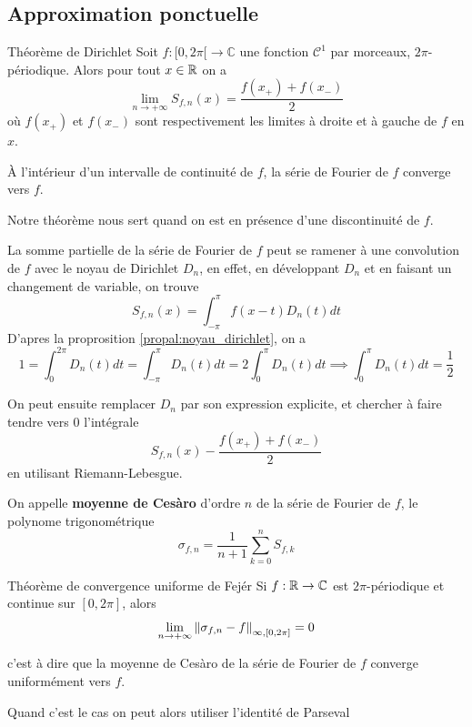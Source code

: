 \documentclass[a4paper, 12pt]{article}
\renewcommand*{\today}{02 April 2026}
\begin{document}
\hotbox{Analyse 4}{CM 14}{\today}

\subsection{Approximation ponctuelle}

\begin{theoreme}{Théorème de Dirichlet}{}
    Soit $f: [0, 2\pi[ \to \mathbb{C}$ une fonction $\mathcal{C}^1$ par morceaux, $2\pi$-périodique.
    Alors pour tout $x \in \mathbb{R}$ on a
    $$
    \lim_{n \to +\infty} S_{f,n}(x) = \dfrac{f(x_+) + f(x_-)}{2}
    $$
    où $f(x_+)$ et $f(x_-)$ sont respectivement les limites à droite et à gauche de $f$ en $x$.
\end{theoreme}

\begin{remarque}
    À l'intérieur d'un intervalle de continuité de $f$, la série de Fourier de $f$ converge vers $f$.
    
    Notre théorème nous sert quand on est en présence d'une discontinuité de $f$.
\end{remarque}

\begin{demonstration}
    La somme partielle de la série de Fourier de $f$ peut se ramener à une convolution de $f$ avec le noyau de Dirichlet $D_n$,
    en effet, en développant $D_n$ et en faisant un changement de variable, on trouve
    $$    
    S_{f,n}(x) = \int_{-\pi}^{\pi} f(x-t) D_n(t) dt
    $$
    D'apres la proprosition \ref{propal:noyau_dirichlet}, on a
    $$
    1 = \int_{0}^{2\pi} D_n(t) dt = \int_{-\pi}^{\pi} D_n(t) dt = 2\int_{0}^{\pi} D_n(t) dt
    \implies \int_{0}^{\pi} D_n(t) dt = \frac{1}{2} 
    $$

    On peut ensuite remplacer $D_n$ par son expression explicite, et chercher à faire tendre vers $0$ l'intégrale
    $$
    S_{f,n}(x) - \frac{f(x_+) + f(x_-)}{2}
    $$
    en utilisant Riemann-Lebesgue.
\end{demonstration}

\begin{definition}
    On appelle \textbf{moyenne de Cesàro} d'ordre $n$ de la série de Fourier de $f$, le polynome trigonométrique
    $$
    \sigma_{f,n} = \frac{1}{n + 1} \sum_{k=0}^n S_{f,k}
    $$
\end{definition}

\begin{theoreme}{Théorème de convergence uniforme de Fejér}{}
    Si $f: \mathbb{R} \to \mathbb{C}$ est $2\pi$-périodique et continue sur $[0, 2\pi]$, alors
    $$
    \lim_{n \to +\infty} \left\lVert\sigma_{f,n} - f\right\rVert_{\infty, [0, 2\pi]} = 0
    $$
    
    c'est à dire que la moyenne de Cesàro de la série de Fourier de $f$ converge uniformément vers $f$.
\end{theoreme}

\begin{remarque}
    Quand c'est le cas on peut alors utiliser l'identité de Parseval
\end{remarque}

\begin{demonstration}
    \n
    \n
    \n
    \n
    \n
    \n
    \n
    \n
    \n
    \n
    \n
\end{demonstration}
\end{document}
